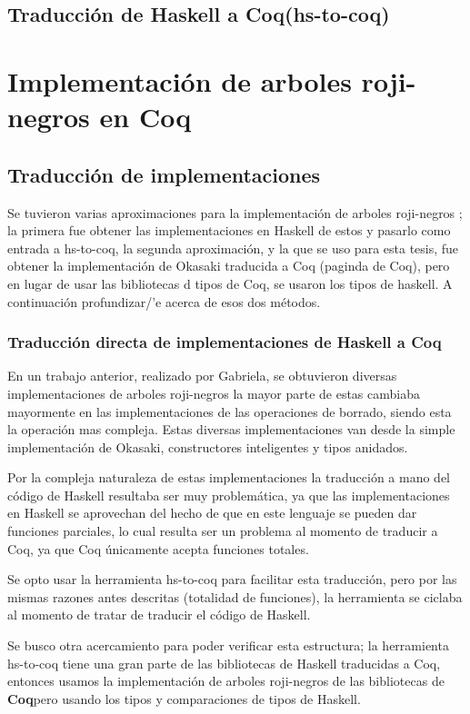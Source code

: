 \documentclass[letterpaper,12pt,oneside]{book}
\newcommand{\coq}{\textbf{Coq}}
\newcommand{\arns}{arboles roji-negros }
\theoremstyle{plain}
\theoremstyle{definition}
\theoremstyle{remark}
\begin{document}
\section{Traducción de Haskell a \coq (hs-to-coq)}

\chapter{Implementación de arboles roji-negros en \coq}

\section{Traducción de implementaciones}
Se tuvieron varias aproximaciones para la implementación de \arns; la primera fue obtener las implementaciones en
Haskell de estos\cite{tesisG} y pasarlo como entrada a hs-to-coq, la 
segunda aproximación, y la que se uso para esta tesis, fue obtener la implementación de Okasaki traducida a Coq 
(paginda de Coq), pero en lugar de usar las bibliotecas d tipos de Coq, se usaron los tipos de haskell.
A continuación profundizar/'e acerca de esos dos métodos.
\subsection{Traducción directa de implementaciones de Haskell a Coq}
En un trabajo anterior, realizado por Gabriela, se obtuvieron diversas implementaciones de \arns la mayor parte de estas
cambiaba mayormente en las implementaciones de las operaciones de borrado, siendo esta la operación mas compleja. 
Estas diversas implementaciones van desde la simple implementación de Okasaki, constructores inteligentes y tipos anidados.

Por la compleja naturaleza de estas implementaciones la traducción a mano del código de Haskell resultaba ser muy problemática,
ya que las implementaciones en Haskell se aprovechan del hecho de que en este lenguaje se pueden dar funciones parciales, 
lo cual resulta ser un problema al momento de traducir a Coq, ya que Coq únicamente acepta funciones totales.

Se opto usar la herramienta hs-to-coq para facilitar esta traducci\'on, pero por las mismas razones antes descritas (totalidad de funciones),
la herramienta se ciclaba al momento de tratar de traducir el c\'odigo de Haskell. 

Se busco otra acercamiento para poder verificar esta estructura; la herramienta hs-to-coq tiene una gran parte de las bibliotecas de Haskell 
traducidas a Coq, entonces usamos la implementación de \arns de las bibliotecas de \coq pero usando los tipos y comparaciones de tipos de Haskell.
\end{document}
